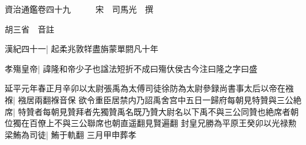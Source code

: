 






























































資治通鑑卷四十九　　　宋　司馬光　撰

胡三省　音註

漢紀四十一|{
	起柔兆敦䍧盡旃蒙單閼凡十年}


孝殤皇帝|{
	諱隆和帝少子也諡法短折不成曰殤㐲侯古今注曰隆之字曰盛}


延平元年春正月辛卯以太尉張禹為太傅司徒徐防為太尉參録尚書事太后以帝在襁褓|{
	襁居兩翻褓音保}
欲令重臣居禁内乃詔禹舍宫中五日一歸府每朝見特贊與三公絶席|{
	特贊者每朝見贊拜者先獨贊禹名既乃贊大尉名以下禹不與三公同贊也絶席者朝位獨在百僚上不與三公聯席也朝直遥翻見賢遍翻}
封皇兄勝為平原王癸卯以光禄勲梁鮪為司徒|{
	鮪于軌翻}
三月甲申葬孝

